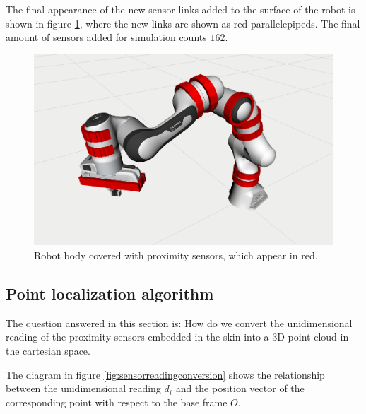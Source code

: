 The final appearance of the new sensor links added to the surface of the robot is shown in figure \ref{fig:sensorssimulation}, where the new links are shown as red parallelepipeds. The final amount of sensors added for simulation counts $162$.

\begin{figure}[H]
    \caption[proximity sensors]{
    Robot body covered with proximity sensors, which appear in red.
    }
    \begin{center}
    \includegraphics[width=\textwidth]{figs/sensors_simulation.png}
    \end{center}
\label{fig:sensorssimulation}
\end{figure}

\subsection{Point localization algorithm}
\label{ss:pointcloud}

The question answered in this section is: How do we convert the unidimensional reading of the proximity sensors embedded in the skin into a 3D point cloud in the cartesian space.

The diagram in figure \ref{fig:sensorreadingconversion} shows the relationship between the unidimensional reading $d_i$ and the position vector of the corresponding point with respect to the base frame $O$.

